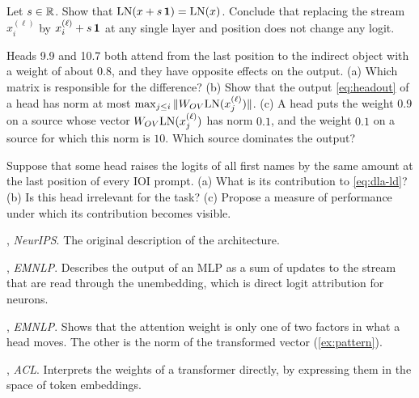 \begin{exercise}\label{ex:ones}
Let $s\in\mathbb{R}$. Show that $\mathrm{LN}(x+s\,\mathbf{1})=\mathrm{LN}(x)$. Conclude that replacing the stream $x_i^{(\ell)}$ by
$x_i^{(\ell)}+s\,\mathbf{1}$ at any single layer and position does not change any logit.
\end{exercise}

\begin{exercise}\label{ex:pattern}
Heads 9.9 and 10.7 both attend from the last position to the indirect object with a weight of about $0.8$, and
they have opposite effects on the output. (a) Which matrix is responsible for the difference? (b) Show that the
output \eqref{eq:headout} of a head has norm at most $\max_{j\le i}\|W_{OV}\mathrm{LN}(x_j^{(\ell)})\|$. (c) A head puts
the weight $0.9$ on a source whose vector $W_{OV}\mathrm{LN}(x_j^{(\ell)})$ has norm $0.1$, and the weight $0.1$ on a
source for which this norm is $10$. Which source dominates the output?
\end{exercise}

\begin{exercise}\label{ex:metric}
Suppose that some head raises the logits of all first names by the same amount at the last position of every IOI
prompt. (a) What is its contribution to \eqref{eq:dla-ld}? (b) Is this head irrelevant for the task? (c) Propose
a measure of performance under which its contribution becomes visible.
\end{exercise}

\begin{readinglist}
\item \citet{vaswani2017attention}, \emph{NeurIPS}. The original description of the architecture.
\item \citet{geva2022transformer}, \emph{EMNLP}. Describes the output of an MLP as a sum of updates to the stream
that are read through the unembedding, which is direct logit attribution for neurons.
\item \citet{kobayashi2020attention}, \emph{EMNLP}. Shows that the attention weight is only one of two factors in
what a head moves. The other is the norm of the transformed vector (\cref{ex:pattern}).
\item \citet{dar2023analyzing}, \emph{ACL}. Interprets the weights of a transformer directly, by expressing them
in the space of token embeddings.
\end{readinglist}
